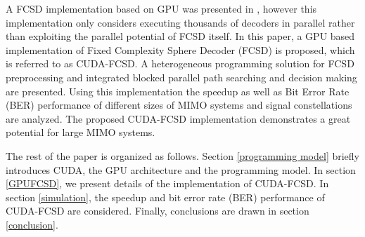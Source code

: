 \documentclass[letterpaper, 10pt, conference]{ieeeconf}
\begin{document}
  A FCSD implementation based on GPU was presented in \cite{hongyuan2010fixed}, however this implementation only considers executing thousands of decoders in parallel rather than exploiting the parallel potential of FCSD itself. In this paper, a GPU based implementation of Fixed Complexity Sphere Decoder (FCSD) is proposed, which is referred to as CUDA-FCSD. A heterogeneous programming solution for FCSD preprocessing and integrated blocked parallel path searching and decision making are presented. Using this implementation the speedup as well as Bit Error Rate (BER) performance of different sizes of MIMO systems and signal constellations are analyzed. The proposed CUDA-FCSD implementation demonstrates a great potential for large MIMO systems.

The rest of the paper is organized as follows. Section \ref{programming model} briefly introduces CUDA, the GPU architecture and the programming model. In section \ref{GPUFCSD}, we present details of the implementation of CUDA-FCSD. In section \ref{simulation}, the speedup and bit error rate (BER) performance of CUDA-FCSD are considered. Finally, conclusions are drawn in section \ref{conclusion}.    

%
%

\end{document}
